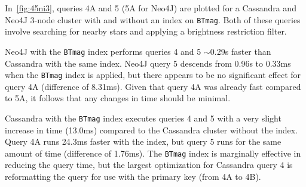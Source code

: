 In~\autoref{fig:45ni3}, queries 4A and 5 (5A for Neo4J) are plotted for a Cassandra and Neo4J 3-node cluster
with and without an index on \texttt{BTmag}.
Both of these queries involve searching for nearby stars and applying a brightness restriction filter.

Neo4J with the \texttt{BTmag} index performs queries 4 and 5 $\sim$0.29s faster than Cassandra with the same index.
Neo4J query 5 descends from 0.96s to 0.33ms when the \texttt{BTmag} index is applied, but there appears to be no
significant effect for query 4A (difference of 8.31ms).
Given that query 4A was already fast compared to 5A, it follows that any changes in time should be minimal.

Cassandra with the \texttt{BTmag} index executes queries 4 and 5 with a very slight increase in time (13.0ms) compared
to the Cassandra cluster without the index.
Query 4A runs 24.3ms faster with the index, but query 5 runs for the same amount of time (difference of 1.76ms).
The \texttt{BTmag} index is marginally effective in reducing the query time, but the largest optimization for
Cassandra query 4 is reformatting the query for use with the primary key (from 4A to 4B).


